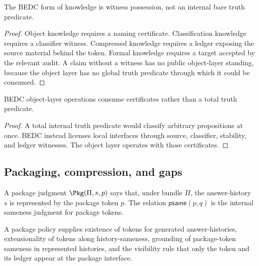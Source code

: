 \begin{theorem}
\label{thm:philosophy-knowledge-witness-not-bare-truth}
The BEDC form of knowledge is witness possession, not an internal bare
truth predicate.
\end{theorem}
\begin{proof}
Object knowledge requires a naming certificate. Classification
knowledge requires a classifier witness. Compressed knowledge requires
a ledger exposing the source material behind the token. Formal
knowledge requires a target accepted by the relevant audit. A claim
without a witness has no public object-layer standing, because the
object layer has no global truth predicate through which it could be
consumed.
\end{proof}

\begin{corollary}
\label{cor:philosophy-truth-meta-certificates-object-layer}
BEDC object-layer operations consume certificates rather than a total
truth predicate.
\end{corollary}
\begin{proof}
A total internal truth predicate would classify arbitrary propositions
at once. BEDC instead licenses local interfaces through source,
classifier, stability, and ledger witnesses. The object layer operates
with those certificates.
\end{proof}

\subsection{Packaging, compression, and gaps}
\label{subsec:philosophy-packaging-compression-gaps}

\begin{definition}
\label{def:philosophy-package-token}
A package judgment \(\Pkg(\Pi,s,p)\) says that, under bundle \(\Pi\),
the answer-history \(s\) is represented by the package token \(p\).
The relation \(\mathsf{psame}(p,q)\) is the internal sameness judgment
for package tokens.
\end{definition}

\begin{definition}
\label{def:philosophy-package-policy}
A package policy supplies existence of tokens for generated
answer-histories, extensionality of tokens along history-sameness,
grounding of package-token sameness in represented histories, and the
visibility rule that only the token and its ledger appear at the
package interface.
\end{definition}

